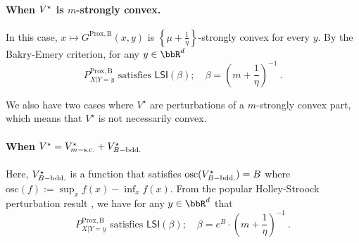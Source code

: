 \documentclass[11pt]{article}
\newcounter{ct}
\newcommand{\potential}[1]{
    \ensuremath{\if$#1$V\else V(#1)\fi}
}
\newcommand{\LSI}[1]{\mathsf{LSI}\left(#1\right)}
\begin{document}
\paragraph{When \(\potential{}^{\star}\) is \(m\)-strongly convex.}
In this case, \(x \mapsto G^{\mathrm{Prox,B}}(x, y)\) is \(\left\{\mu + \frac{1}{\eta}\right\}\)-strongly convex for every \(y\).
By the Bakry-Emery criterion, for any \(y \in \bbR^{d}\)
\begin{equation*}
    P^{\mathrm{Prox,B}}_{X | Y = y} \text{ satisfies } \LSI{\beta}; \quad \beta = \left(m + \frac{1}{\eta}\right)^{-1}~.
\end{equation*}

We also have two cases where \(V^{\star}\) are perturbations of a \(m\)-strongly convex part, which means that \(V^{\star}\) is not necessarily convex.

\paragraph{When \(\potential{}^{\star} = \potential{}^{\star}_{m-\text{s.c.}} + \potential{}^{\star}_{B-\text{bdd.}}\)}

Here, \(\potential{}^{\star}_{B-\text{bdd.}}\) is a function that satisfies \(\mathrm{osc}(\potential{}^{\star}_{B-\text{bdd.}}) = B\) where \(\mathrm{osc}(f) := \sup_{x} f(x) - \inf_{x} f(x)\).
From the popular Holley-Stroock perturbation result \citep[Prop. 5.1.6]{bakry2014analysis}, we have for any \(y \in \bbR^{d}\) that
\begin{equation*}
    P^{\mathrm{Prox,B}}_{X | Y = y} \text{ satisfies } \LSI{\beta}; \quad \beta = e^{B} \cdot \left(m + \frac{1}{\eta}\right)^{-1}~.
\end{equation*}
\end{document}
